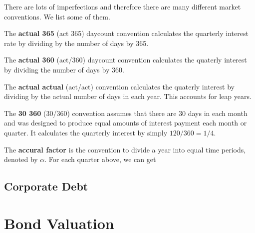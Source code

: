 \documentclass{article}
\begin{document}
      There are lots of imperfections and therefore there are many different market conventions. We list some of them. 

      \begin{definition}[Act/365]
        \label{def:act-365}
        The \textbf{actual 365} (act 365) daycount convention calculates the quarterly interest rate by dividing by the number of days by 365. 
      \end{definition}

      \begin{definition}[Act/360]
        \label{def:act-360}
        The \textbf{actual 360} (act/360) daycount convention calculates the quaterly interest by dividing the number of days by 360. 
      \end{definition}

      \begin{definition}
        \label{def:act-act}
        The \textbf{actual actual} (act/act) convention calculates the quaterly interest by dividing by the actual number of days in each year. This accounts for leap years. 
      \end{definition}    

      \begin{definition}[30/360]
        \label{def:30-360}
        The \textbf{30 360} (30/360) convention assumes that there are 30 days in each month and was designed to produce equal amounts of interest payment each month or quarter. It calculates the quarterly interest by simply $120/360 = 1/4$.
      \end{definition}

      \begin{example}
        \label{ex:accural-factors-for-each-quarter}
        The \textbf{accural factor} is the convention to divide a year into equal time periods, denoted by $\alpha$. For each quarter above, we can get 
      \end{example}

  \subsection{Corporate Debt}

\section{Bond Valuation}
\end{document}
